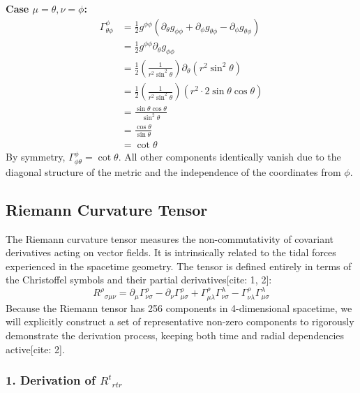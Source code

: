 \documentclass[11pt, a4paper]{report}
\begin{document}
\textbf{Case $\mu = \theta, \nu = \phi$:}
\begin{align}
    \Gamma^\phi_{\theta\phi} &= \frac{1}{2} g^{\phi\phi} (\partial_\theta g_{\phi\phi} + \partial_\phi g_{\theta\phi} - \partial_\phi g_{\theta\phi}) \nonumber \\
    &= \frac{1}{2} g^{\phi\phi} \partial_\theta g_{\phi\phi} \nonumber \\
    &= \frac{1}{2} \left( \frac{1}{r^2 \sin^2\theta} \right) \partial_\theta \left( r^2 \sin^2\theta \right) \nonumber \\
    &= \frac{1}{2} \left( \frac{1}{r^2 \sin^2\theta} \right) \left( r^2 \cdot 2\sin\theta\cos\theta \right) \nonumber \\
    &= \frac{\sin\theta\cos\theta}{\sin^2\theta} \nonumber \\
    &= \frac{\cos\theta}{\sin\theta} \nonumber \\
    &= \cot\theta
\end{align}
By symmetry, $\Gamma^\phi_{\phi\theta} = \cot\theta$. All other components identically vanish due to the diagonal structure of the metric and the independence of the coordinates from $\phi$.



\subsection{Riemann Curvature Tensor}

The Riemann curvature tensor measures the non-commutativity of covariant derivatives acting on vector fields. It is intrinsically related to the tidal forces experienced in the spacetime geometry. The tensor is defined entirely in terms of the Christoffel symbols and their partial derivatives[cite: 1, 2]:
\begin{equation}
    {R^\rho}_{\sigma\mu\nu} = \partial_\mu \Gamma^\rho_{\nu\sigma} - \partial_\nu \Gamma^\rho_{\mu\sigma} + \Gamma^\rho_{\mu\lambda}\Gamma^\lambda_{\nu\sigma} - \Gamma^\rho_{\nu\lambda}\Gamma^\lambda_{\mu\sigma}
\end{equation}
Because the Riemann tensor has 256 components in 4-dimensional spacetime, we will explicitly construct a set of representative non-zero components to rigorously demonstrate the derivation process, keeping both time and radial dependencies active[cite: 2].

\subsubsection*{1. Derivation of ${R^t}_{rtr}$}
\end{document}
